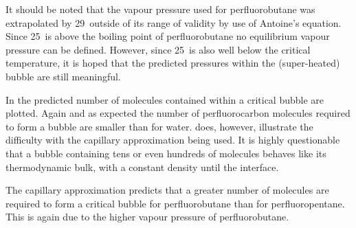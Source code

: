 It should be noted that the vapour pressure used for perfluorobutane was extrapolated by \unit{29}\degreecelsius\  outside of its range of validity\cite{NISTdata}
 by use of Antoine's equation.
Since \unit{25}\degreecelsius\ is above the boiling point of perfluorobutane no  equilibrium vapour pressure can be defined.
However, since \unit{25}\degreecelsius\ is also well below the critical temperature, %
it is hoped that the predicted pressures within the (super-heated) bubble are still meaningful.


In   the predicted number of molecules contained within a critical bubble are plotted.
Again and as expected the number of perfluorocarbon molecules required to form a bubble are smaller than for water.
 does, however, illustrate  the difficulty with the capillary approximation being used.
It is highly questionable that a bubble containing tens or even hundreds of molecules behaves like its thermodynamic bulk, with a constant density until the interface.


The capillary approximation predicts that a greater number of molecules are required to form a critical bubble for perfluorobutane than for perfluoropentane.
This is again due to the higher vapour pressure of  perfluorobutane.






